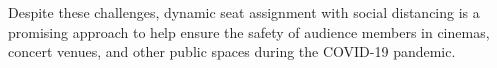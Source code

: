 
Despite these challenges, dynamic seat assignment with social distancing is a promising approach to help ensure the safety of audience members in cinemas, concert venues, and other public spaces during the COVID-19 pandemic.















\newpage
